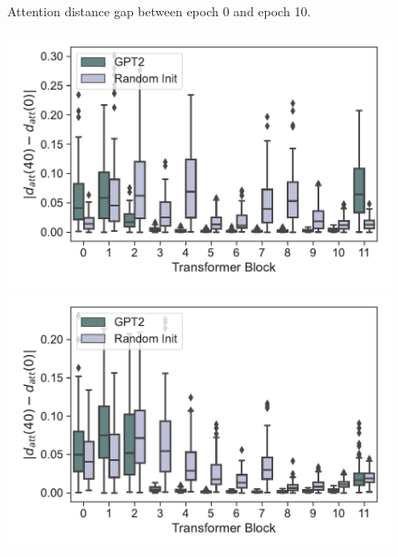 \documentclass{article}
\begin{document}
\begin{figure}[H]
\begin{minipage}[b]{0.32\linewidth}
    \end{minipage}
    \caption{Attention distance gap between epoch 0 and epoch 10.}
\end{figure}

\begin{figure}[H]
    \centering
    \begin{minipage}[b]{0.32\linewidth}
        \includegraphics[width=\linewidth]{figs/att_dist_diff_0_40_gpt2_dt_hopper_medium_666_K1.pdf}
    \end{minipage}
    \begin{minipage}[b]{0.32\linewidth}
        \includegraphics[width=\linewidth]{figs/att_dist_diff_0_40_gpt2_dt_halfcheetah_medium_666_K1.pdf}
    \end{minipage}
    \begin{minipage}[b]{0.32\linewidth}

\end{minipage}
\end{figure}
\end{document}
